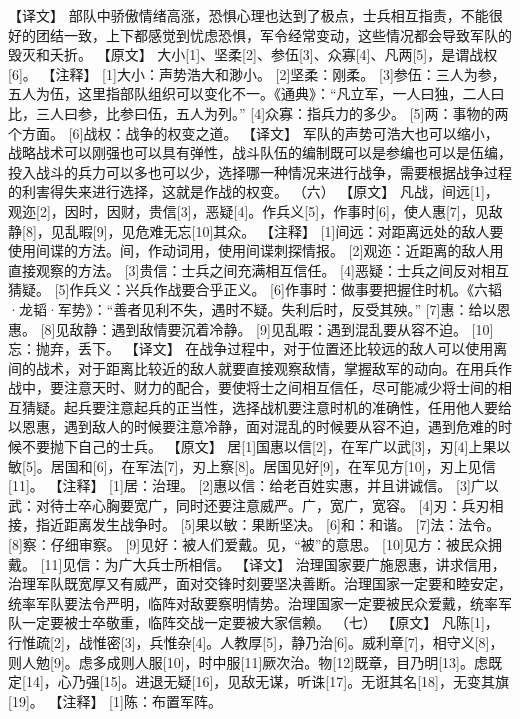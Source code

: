 \documentclass[a4paper,12pt,UTF8,twoside]{ctexbook}
\begin{document}
【译文】
部队中骄傲情绪高涨，恐惧心理也达到了极点，士兵相互指责，不能很好的团结一致，上下都感觉到忧虑恐惧，军令经常变动，这些情况都会导致军队的毁灭和夭折。
【原文】
大小[1]、坚柔[2]、参伍[3]、众寡[4]、凡两[5]，是谓战权[6]。
【注释】
[1]大小：声势浩大和渺小。
[2]坚柔：刚柔。
[3]参伍：三人为参，五人为伍，这里指部队组织可以变化不一。《通典》：“凡立军，一人曰独，二人曰比，三人曰参，比参曰伍，五人为列。”
[4]众寡：指兵力的多少。
[5]两：事物的两个方面。
[6]战权：战争的权变之道。
【译文】
军队的声势可浩大也可以缩小，战略战术可以刚强也可以具有弹性，战斗队伍的编制既可以是参编也可以是伍编，投入战斗的兵力可以多也可以少，选择哪一种情况来进行战争，需要根据战争过程的利害得失来进行选择，这就是作战的权变。
（六）
【原文】
凡战，间远[1]，观迩[2]，因时，因财，贵信[3]，恶疑[4]。作兵义[5]，作事时[6]，使人惠[7]，见敌静[8]，见乱暇[9]，见危难无忘[10]其众。
【注释】
[1]间远：对距离远处的敌人要使用间谍的方法。间，作动词用，使用间谍刺探情报。
[2]观迩：近距离的敌人用直接观察的方法。
[3]贵信：士兵之间充满相互信任。
[4]恶疑：士兵之间反对相互猜疑。
[5]作兵义：兴兵作战要合乎正义。
[6]作事时：做事要把握住时机。《六韬·龙韬·军势》：“善者见利不失，遇时不疑。失利后时，反受其殃。”
[7]惠：给以恩惠。
[8]见敌静：遇到敌情要沉着冷静。
[9]见乱暇：遇到混乱要从容不迫。
[10]忘：抛弃，丢下。
【译文】
在战争过程中，对于位置还比较远的敌人可以使用离间的战术，对于距离比较近的敌人就要直接观察敌情，掌握敌军的动向。在用兵作战中，要注意天时、财力的配合，要使将士之间相互信任，尽可能减少将士间的相互猜疑。起兵要注意起兵的正当性，选择战机要注意时机的准确性，任用他人要给以恩惠，遇到敌人的时候要注意冷静，面对混乱的时候要从容不迫，遇到危难的时候不要抛下自己的士兵。
【原文】
居[1]国惠以信[2]，在军广以武[3]，刃[4]上果以敏[5]。居国和[6]，在军法[7]，刃上察[8]。居国见好[9]，在军见方[10]，刃上见信[11]。
【注释】
[1]居：治理。
[2]惠以信：给老百姓实惠，并且讲诚信。
[3]广以武：对待士卒心胸要宽广，同时还要注意威严。广，宽广，宽容。
[4]刃：兵刃相接，指近距离发生战争时。
[5]果以敏：果断坚决。
[6]和：和谐。
[7]法：法令。
[8]察：仔细审察。
[9]见好：被人们爱戴。见，“被”的意思。
[10]见方：被民众拥戴。
[11]见信：为广大兵士所相信。
【译文】
治理国家要广施恩惠，讲求信用，治理军队既宽厚又有威严，面对交锋时刻要坚决善断。治理国家一定要和睦安定，统率军队要法令严明，临阵对敌要察明情势。治理国家一定要被民众爱戴，统率军队一定要被士卒敬重，临阵交战一定要被大家信赖。
（七）
【原文】
凡陈[1]，行惟疏[2]，战惟密[3]，兵惟杂[4]。人教厚[5]，静乃治[6]。威利章[7]，相守义[8]，则人勉[9]。虑多成则人服[10]，时中服[11]厥次治。物[12]既章，目乃明[13]。虑既定[14]，心乃强[15]。进退无疑[16]，见敌无谋，听诛[17]。无诳其名[18]，无变其旗[19]。
【注释】
[1]陈：布置军阵。
\end{document}
